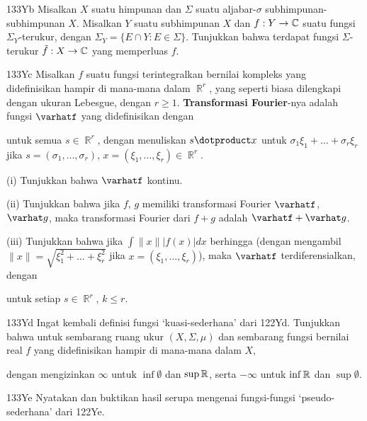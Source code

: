 {\spheader 133Yb Misalkan $X$ suatu himpunan dan $\Sigma$ suatu
aljabar-$\sigma$ subhimpunan-subhimpunan $X$. Misalkan $Y$ suatu subhimpunan
$X$ dan $f:Y\to\Bbb C$ suatu fungsi $\Sigma_Y$-terukur, dengan
$\Sigma_Y=\{E\cap Y:E\in\Sigma\}$. Tunjukkan bahwa terdapat fungsi
$\Sigma$-terukur $\tilde f:X\to\Bbb C$ yang memperluas $f$. 

\spheader 133Yc Misalkan $f$ suatu fungsi terintegralkan bernilai kompleks
yang didefinisikan hampir di mana-mana dalam $\BbbR^r$, yang seperti biasa
dilengkapi dengan ukuran Lebesgue, dengan $r\ge 1$. {\bf Transformasi
Fourier}-nya adalah fungsi $\varhatf$ yang didefinisikan dengan


\noindent untuk semua $s\in\BbbR^r$, dengan menuliskan $s\dotproduct x$
untuk $\sigma_1\xi_1+\ldots+\sigma_r\xi_r$ jika
$s=(\sigma_1,\ldots,\sigma_r)$,
$x=(\xi_1,\ldots,\xi_r)\in\BbbR^r$.

\quad(i) Tunjukkan bahwa $\varhatf$ kontinu.

\quad(ii) Tunjukkan bahwa jika $f$, $g$ memiliki transformasi Fourier
$\varhatf$, $\varhat g$, maka transformasi Fourier dari $f+g$ adalah
$\varhatf+\varhat g$.

\quad (iii) Tunjukkan bahwa jika $\int\|x\||f(x)|dx$ berhingga
(dengan mengambil $\|x\|=\sqrt{\xi_1^2+\ldots+\xi_r^2}$ jika
$x=(\xi_1,\dots,\xi_r)$), maka $\varhatf$ terdiferensialkan, dengan


\noindent untuk setiap $s\in\BbbR^r$, $k\le r$.

\spheader 133Yd Ingat kembali definisi fungsi `kuasi-sederhana' dari 122Yd.
Tunjukkan bahwa untuk sembarang ruang ukur $(X,\Sigma,\mu)$ dan sembarang
fungsi bernilai real $f$ yang didefinisikan hampir di mana-mana dalam $X$,



\noindent dengan mengizinkan $\infty$ untuk $\inf\emptyset$ dan
$\sup\Bbb R$, serta $-\infty$ untuk $\inf\Bbb R$ dan $\sup\emptyset$.

\spheader 133Ye Nyatakan dan buktikan hasil serupa mengenai fungsi-fungsi
`pseudo-sederhana' dari 122Ye.
}%

